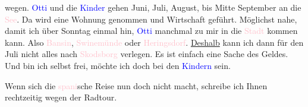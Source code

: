               wegen. \textcolor{blue}{Otti}{}\ledrightnote{\textcolor{blue}{Ottilie Salten}} und die \textcolor{blue}{Kinder}{}\ledrightnote{{$\rightarrow$}\textcolor{blue}{Anna Katharina Rehmann}{\newline}{$\rightarrow$}\textcolor{blue}{Paul Salten}} gehen Juni, Juli, August, bis Mitte September an die \textcolor{pink}{See}{}\ledrightnote{{$\rightarrow$}\textcolor{pink}{Ostsee}}. Da wird eine Wohnung
               genommen und Wirtschaft geführt. Möglichst nahe, damit ich über Sonntag einmal hin,
                  \textcolor{blue}{Otti}{}\ledrightnote{\textcolor{blue}{Ottilie Salten}} manchmal zu mir in die \textcolor{pink}{Stadt}{}\ledrightnote{{$\rightarrow$}\textcolor{pink}{Berlin}} kommen kann. Also \textcolor{pink}{Bansin}{}\ledrightnote{\textcolor{pink}{Bansin}}, \textcolor{pink}{Swinemünde}{}\ledrightnote{\textcolor{pink}{Świnoujście}} oder \textcolor{pink}{Heringsdorf}{}\ledrightnote{\textcolor{pink}{Heringsdorf}}. \uline{Deshalb} kann ich dann für den Juli nicht alles nach \textcolor{pink}{Skodsborg}{}\ledrightnote{\textcolor{pink}{Skodsborg}}
               verlegen. Es ist einfach eine Sache des Geldes. Und bin ich selbst frei, möchte ich
               doch bei den \textcolor{blue}{Kindern}{}\ledrightnote{{$\rightarrow$}\textcolor{blue}{Anna Katharina Rehmann}{\newline}{$\rightarrow$}\textcolor{blue}{Paul Salten}} sein.\pend
           
\pstart
           Wenn sich die \textcolor{pink}{spani}{}\ledrightnote{{$\rightarrow$}\textcolor{pink}{Spanien}}sche Reise
               nun doch nicht macht, schreibe ich Ihnen rechtzeitig wegen der Radtour.\pend
           
